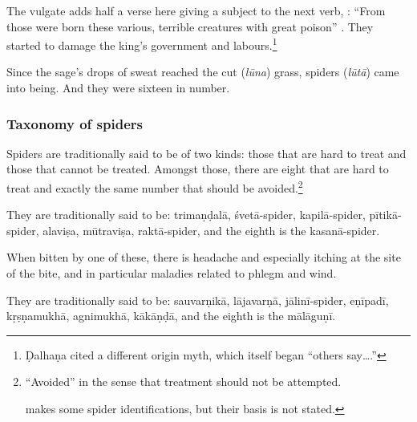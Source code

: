 \begin{translation}
{    The vulgate adds half a verse here giving a subject to the next
verb, : “From those were born these various,
terrible creatures with great poison” .} They
started to damage the king's government and labours.\footnote{Ḍalhaṇa 
    cited a different origin myth, which itself began “others say\ldots .”}
    
    
\item[93]

Since the sage's drops of sweat reached the cut
(\emph{lūna}) grass, spiders (\emph{lūtā}) came into being.  And they
were sixteen in number.
    
 
 
 
 \subsubsection{Taxonomy of spiders}
 
 \item[94] 
 
 Spiders are traditionally said to be of two kinds:  those that are hard
 to treat and those that cannot be treated.  Amongst those, there are eight
 that are hard to treat and exactly the same number that should be 
 avoided.\footnote{ “Avoided” in the sense that treatment should not be 
 attempted.
     
     \citet{mana-2009} makes some spider identifications, but 
 their basis is not stated.}
 
 \item[95]
 
 They are traditionally said to be:
 \Gls{trimaṇḍalā}, 
 \Gls{śvetā-spider}, 
 \Gls{kapilā-spider}, 
 \Gls{pītikā-spider}, 
 \Gls{alaviṣa}, 
 \Gls{mūtraviṣa}, 
 \Gls{raktā-spider}, and the eighth is the
 \Gls{kasanā-spider}.
 
 \item[96]
 
 When bitten by one of these, there is headache and especially itching
at the site of the bite, and in particular maladies related to phlegm
and wind.
 
 \item[97]
 
 They are traditionally said to be:
 \label{sauvarnika-group}
 \Gls{sauvarṇikā},
 \Gls{lājavarṇā},
 \Gls{jālinī-spider},
 \Gls{eṇīpadī},
 \Gls{kṛṣṇamukhā},
 \Gls{agnimukhā},
 \Gls{kākāṇḍā}, and the eighth is the
 \Gls{mālāguṇī}.

\item[98]


\end{translation}
